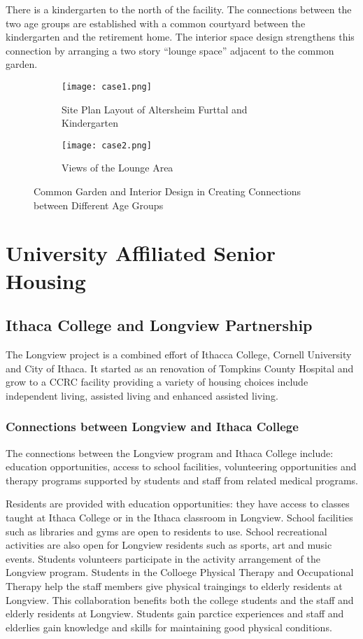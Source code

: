 There is a kindergarten to the north of the facility. The connections
between the two age groups are established with a common courtyard
between the kindergarten and the retirement home. The interior space
design strengthens this connection by arranging a two story ``lounge
space'' adjacent to the common garden.

\begin{figure}
\centering
\begin{subfigure}{0.7\textwidth}
  \centering
  \texttt{[image: case1.png]}
  \caption{Site Plan Layout of Altersheim Furttal and Kindergarten}
  \label{fig:case1}
\end{subfigure}
\begin{subfigure}{0.7\textwidth}
  \centering
  \texttt{[image: case2.png]}
  \caption{Views of the Lounge Area}
  \label{fig:case2}
\end{subfigure}
\caption{Common Garden and Interior Design in Creating Connections
  between Different Age Groups}
\label{fig:case2}
\end{figure}
\section{University Affiliated Senior Housing}
\subsection{Ithaca College and Longview Partnership}
The Longview project is a combined effort of Ithacca College, Cornell
University and City of Ithaca. It started as an renovation of Tompkins
County Hospital and grow to a CCRC facility providing a variety of
housing choices include independent living, assisted living and
enhanced assisted living.

\subsubsection{Connections between Longview and Ithaca College}
The connections between the Longview program and Ithaca College
include: education opportunities, access to school facilities,
volunteering opportunities and therapy programs supported by students
and staff from related medical programs.

Residents are provided with education opportunities: they have access
to classes taught at Ithaca College or in the Ithaca classroom in
Longview. School facilities such as libraries and gyms are open to
residents to use. School recreational activities are also open for
Longview residents such as sports, art and music events. Students
volunteers participate in the activity arrangement of the Longview
program. Students in the Colloege Physical Therapy and Occupational
Therapy help the staff members give physical traingings to elderly
residents at Longview. This collaboration benefits both the college
students and the staff and elderly residents at Longview. Students
gain parctice experiences and staff and elderlies gain knowledge and
skills for maintaining good physical conditions.

